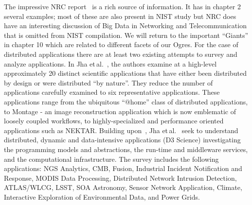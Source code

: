 \documentclass{acm_proc_article-sp}
\begin{document}

The impressive NRC report~\cite{b13} is a rich source of information. It has in chapter 2 several examples; most of these are also present in NIST study but NRC does have an interesting discussion of Big Data in Networking and Telecommunication that is omitted from NIST compilation. We will return to the important ``Giants'' in chapter 10 which are related to different facets of our Ogres.
For the case of distributed applications there are at least two existing attempts to survey and analyze applications. In Jha et\,al.~\cite{b26}, the authors examine at a high-level approximately 20 distinct scientific applications that have either been distributed by design or were distributed ``by nature''.  They reduce the number of applications carefully examined to six representative applications. These applications range from the ubiquitous ``$@$home'' class of distributed applications, to Montage - an image reconstruction application which is now emblematic of loosely coupled workflows, to highly-specialized and performance oriented applications such as NEKTAR. 
Building upon~\cite{b26}, Jha et\,al.~\cite{b28} seek to understand distributed, dynamic and data-intensive applications (D3 Science) investigating the programming models and abstractions, the run-time and middleware services, and the computational infrastructure. The survey includes the following applications: NGS Analytics, CMB, Fusion, Industrial Incident Notification and Response, MODIS Data Processing, Distributed Network Intrusion Detection, ATLAS/WLCG, LSST, SOA Astronomy, Sensor Network Application, Climate, Interactive Exploration of Environmental Data, and Power Grids. 
\end{document}
